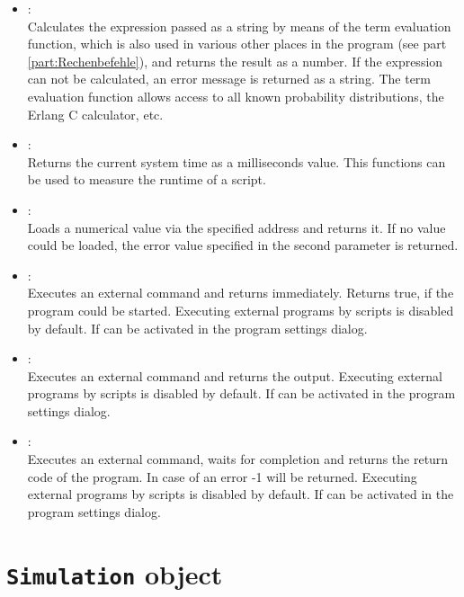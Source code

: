 \begin{itemize}

\item
{}:\\
Calculates the expression passed as a string by means of the term evaluation function,
which is also used in various other places in the program (see part \ref{part:Rechenbefehle}),
and returns the result as a number. If the expression can not be calculated, an error message is returned as a string.
The term evaluation function allows access to all known probability distributions,
the Erlang C calculator, etc.

\item
{}:\\
Returns the current system time as a milliseconds value. This functions can be used to measure
the runtime of a script.

\item
{}:\\
Loads a numerical value via the specified address and returns it.
If no value could be loaded, the error value specified in the second parameter is returned.

\item
{}:\\
Executes an external command and returns immediately. Returns true, if the program could be started.
Executing external programs by scripts is disabled by default. If can be activated
in the program settings dialog.

\item
{}:\\
Executes an external command and returns the output.
Executing external programs by scripts is disabled by default. If can be activated
in the program settings dialog.

\item
{}:\\
Executes an external command, waits for completion and returns the return code of the program.
In case of an error -1 will be returned.
Executing external programs by scripts is disabled by default. If can be activated
in the program settings dialog.

\end{itemize}



\chapter{\texttt{Simulation} object}

